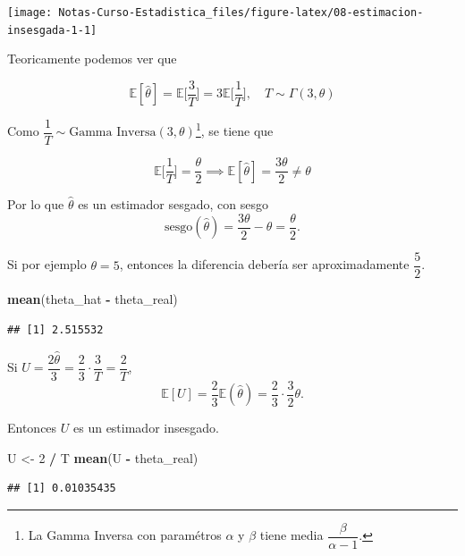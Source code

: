 \documentclass[
  12pt,
]{book}
\newenvironment{Shaded}{\begin{snugshade}}{\end{snugshade}}
\newcommand{\DecValTok}[1]{\textcolor[rgb]{0.00,0.00,0.81}{#1}}
\newcommand{\KeywordTok}[1]{\textcolor[rgb]{0.13,0.29,0.53}{\textbf{#1}}}
\newcommand{\NormalTok}[1]{#1}
\newcommand{\OperatorTok}[1]{\textcolor[rgb]{0.81,0.36,0.00}{\textbf{#1}}}
\newcommand{\StringTok}[1]{\textcolor[rgb]{0.31,0.60,0.02}{#1}}
\begin{document}
\begin{center}\texttt{[image: Notas-Curso-Estadistica\_files/figure-latex/08-estimacion-insesgada-1-1]} \end{center}

Teoricamente podemos ver que

\[\mathbb E[\hat\theta] = \mathbb E\bigg[\dfrac 3T\bigg]= 3\mathbb E\bigg[\dfrac
1T\bigg], \quad T\sim \Gamma(3,\theta)\]

Como \(\dfrac 1T \sim \text{Gamma Inversa}(3,\theta)\)\footnote{La Gamma Inversa con paramétros \(\alpha\) y \(\beta\) tiene media \(\dfrac{\beta}{\alpha-1}.\)}, se tiene que

\[\mathbb E\bigg[\dfrac 1T\bigg] = \dfrac{\theta}2 \implies \mathbb E[\hat
\theta] =\dfrac{3\theta}2 \neq \theta\]

Por lo que \(\hat \theta\) es un estimador sesgado, con sesgo
\[\text{sesgo}(\hat\theta) = \dfrac{3\theta}{2} -\theta = \dfrac \theta 2.\]

Si por ejemplo \(\theta=5\), entonces la diferencia debería ser aproximadamente
\(\dfrac 5 2\).

\begin{Shaded}
\begin{Highlighting}[]
\KeywordTok{mean}\NormalTok{(theta\_hat }\OperatorTok{{-}}\StringTok{ }\NormalTok{theta\_real)}
\end{Highlighting}
\end{Shaded}

\begin{verbatim}
## [1] 2.515532
\end{verbatim}

Si \(U = \dfrac {2\hat\theta}{3} = \dfrac 23 \cdot \dfrac{3}{T} = \dfrac 2T\),
\[\mathbb E[U] = \dfrac 23 \mathbb E(\hat\theta) =\dfrac 23 \cdot \dfrac 32 \theta.\]

Entonces \(U\) es un estimador insesgado.

\begin{Shaded}
\begin{Highlighting}[]
\NormalTok{U \textless{}{-}}\StringTok{ }\DecValTok{2} \OperatorTok{/}\StringTok{ }\NormalTok{T}
\KeywordTok{mean}\NormalTok{(U }\OperatorTok{{-}}\StringTok{ }\NormalTok{theta\_real)}
\end{Highlighting}
\end{Shaded}

\begin{verbatim}
## [1] 0.01035435
\end{verbatim}
\end{document}

